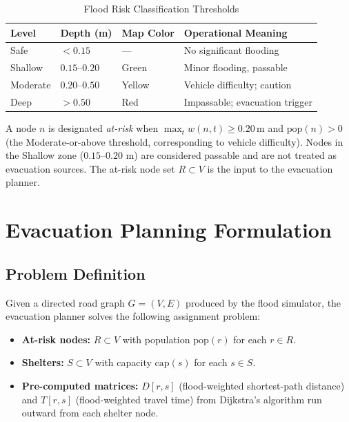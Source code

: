 \documentclass[journal]{IEEEtran}
\begin{document}
\begin{table}[H]
  \centering
  \caption{Flood Risk Classification Thresholds}
  \label{tab:risk}
  \begin{tabular}{@{}llll@{}}
    \toprule
    \textbf{Level} & \textbf{Depth (m)} & \textbf{Map Color} & \textbf{Operational Meaning} \\
    \midrule
    Safe     & $< 0.15$          & ---    & No significant flooding        \\
    Shallow  & $0.15$--$0.20$    & Green  & Minor flooding, passable       \\
    Moderate & $0.20$--$0.50$    & Yellow & Vehicle difficulty; caution    \\
    Deep     & $> 0.50$          & Red    & Impassable; evacuation trigger \\
    \bottomrule
  \end{tabular}
\end{table}

A node $n$ is designated \textit{at-risk} when $\max_t w(n,t) \geq 0.20\,\text{m}$ and
$\text{pop}(n) > 0$ (the Moderate-or-above threshold, corresponding to vehicle difficulty).
Nodes in the Shallow zone ($0.15$--$0.20$ m) are considered passable and are not treated
as evacuation sources. The at-risk node set $R \subset V$ is the input to the evacuation
planner.

\section{Evacuation Planning Formulation}
\label{sec:formulation}

\subsection{Problem Definition}

Given a directed road graph $G = (V, E)$ produced by the flood simulator, the evacuation
planner solves the following assignment problem:

\begin{itemize}
  \item \textbf{At-risk nodes:} $R \subset V$ with population $\text{pop}(r)$ for each
  $r \in R$.
  \item \textbf{Shelters:} $S \subset V$ with capacity $\text{cap}(s)$ for each $s \in S$.
  \item \textbf{Pre-computed matrices:} $D[r,s]$ (flood-weighted shortest-path distance) and
  $T[r,s]$ (flood-weighted travel time) from Dijkstra's algorithm \cite{dijkstra1959} run
  outward from each shelter node.
\end{itemize}
\end{document}
